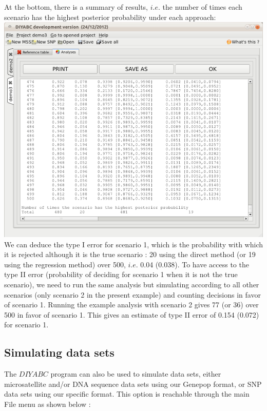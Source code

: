 At the bottom, there is a summary of results, $i.e.$ the number of times each scenario has the highest posterior probability under each approach:\\

\includegraphics[scale=0.33]{gui_pictures/Capture-DIYABC-120.png} \\

We can deduce the type I error for scenario 1,  which is the probability with
which it is rejected although it is the true scenario : 20 using the direct
method (or 19 using the regression method) over 500, $i.e.$ 0.04 (0.038). To
have access to the type II error (probability of deciding for scenario 1 when it
is not the true scenario), we need to run the same analysis but simulating
according to all other scenarios (only scenario 2 in the present example) and
counting decisions in favor of scenario 1. Running the example analysis with
scenario 2 gives 77 (or 36) over 500 in favor of scenario 1. This gives an
estimate of type II error of 0.154 (0.072) for scenario 1.

\subsection{Simulating data sets}

The $DIYABC$ program can also be used to simulate data sets, either microsatellite and/or DNA sequence data sets using our Genepop format, or SNP data sets using our specific format. This option is reachable through the main \textsf{File} menu as shown below :\\

